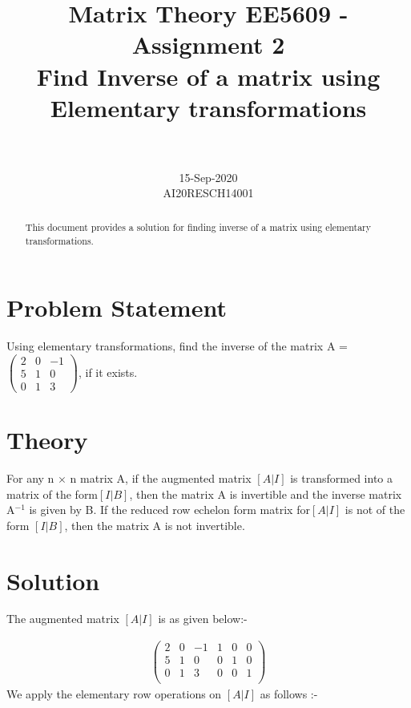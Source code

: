 \documentclass[journal,12pt,twocolumn]{IEEEtran}
\newcommand{\myvec}[1]{\ensuremath{\begin{pmatrix}#1\end{pmatrix}}}
\begin{document}
\title{Matrix Theory EE5609 - Assignment 2\\
Find Inverse of a matrix using Elementary transformations
}

\author{\\
 \\
15-Sep-2020\\
AI20RESCH14001\\
 }

\maketitle
\begin{abstract}
This document provides a solution for finding inverse of a matrix using elementary transformations.
\end{abstract}

\section{Problem Statement}
Using elementary transformations, find the inverse of the matrix  A = $\myvec{2 &0 &-1\\5 &1 &0\\0 &1 &3} $, if it exists.

\section{Theory}
For any n $\times$  n matrix A, if the augmented matrix $ [A | I]$ is transformed into a matrix of the form$ [I|B]$, then the matrix A is invertible and the inverse matrix A$^{-1}$ is given by B. If the reduced row echelon form matrix for$ [A | I]$ is not of the form $[ I | B]$, then the matrix A is not invertible.

\section{Solution}

The augmented matrix $ [A | I]$ is as given below:- 

\begin{align}
\myvec{
		 2 &0 &-1&  1 & 0 &  0 \\
		   5 &1 &0&  0 &  1 &  0 \\
		 0 &1 &3 &  0 &  0 &  1 \\
		 }
 \end{align}
 We apply the elementary row operations on $ [A | I]$ as follows :-
 
\end{document}
